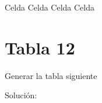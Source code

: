 \documentclass[letterpaper,10pt,spanish]{sphinxmanual}
\begin{document}
\begin{sphinxVerbatim}[commandchars=\\\{\}]
			 Celda 
			 Celda 
			 Celda 
			 Celda 
        
\end{sphinxVerbatim}


\section{Tabla 12}
\label{\detokenize{ejercicios/html/anexo_tablas:tabla-12}}
Generar la tabla siguiente


Solución:
\end{document}
